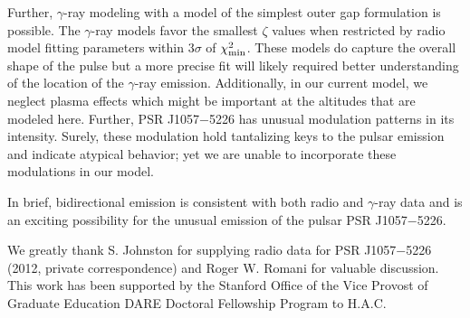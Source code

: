 Further, $\gamma$-ray modeling with a model of the simplest outer gap
formulation is possible.  The $\gamma$-ray models favor the smallest $\zeta$
values when restricted 
by radio model fitting parameters within
$3\sigma$ of $\chi^2_{\rm{min}}$.
These models do capture the overall shape of the pulse but a more precise fit
will likely required better understanding of the location of the $\gamma$-ray
emission.   Additionally, in our current model, we neglect plasma effects which
might be important at the altitudes that are modeled here.  Further,
PSR J1057$-$5226 has unusual modulation patterns in its intensity.  Surely, these
modulation hold tantalizing keys to the pulsar emission and indicate
atypical behavior; yet we are unable to incorporate these modulations in our
model.


In brief, bidirectional emission is consistent with both
radio and $\gamma$-ray data and is an
exciting possibility for the unusual emission
of the pulsar PSR J1057$-$5226.


\acknowledgements
We greatly thank S. Johnston for supplying radio data for PSR J1057$-$5226 (2012, private correspondence)
and Roger W. Romani for valuable discussion. This work has been 
supported by the Stanford Office of
the Vice Provost of Graduate Education DARE Doctoral
Fellowship Program to H.A.C.


